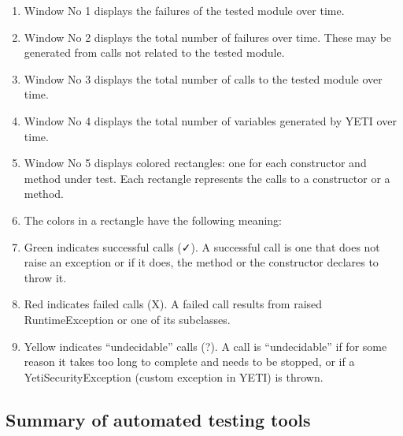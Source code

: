 \begin{enumerate}
\item Window No 1 displays the failures of the tested module over time.
\item Window No 2 displays the total number of failures over time. These may be generated from calls not related to the tested module.
\item Window No 3 displays the total number of calls to the tested module over time. 
\item Window No 4 displays the total number of variables generated by YETI over time.
\item Window No 5 displays colored rectangles: one for each constructor and method under test. Each rectangle represents the calls to a constructor or a method.
\item The colors in a rectangle have the following meaning:
\item Green indicates successful calls (✓). A successful call is one that does not raise an exception or if it does, the method or the constructor declares to throw it.
\item Red indicates failed calls (X). A failed call results from raised RuntimeException or one of its subclasses.
\item Yellow indicates “undecidable” calls (?). A call is “undecidable” if for some reason it takes too long to complete and needs to be stopped, or if a YetiSecurityException (custom exception in YETI) is thrown.
\end{enumerate}


\subsection{Summary of automated testing tools}

